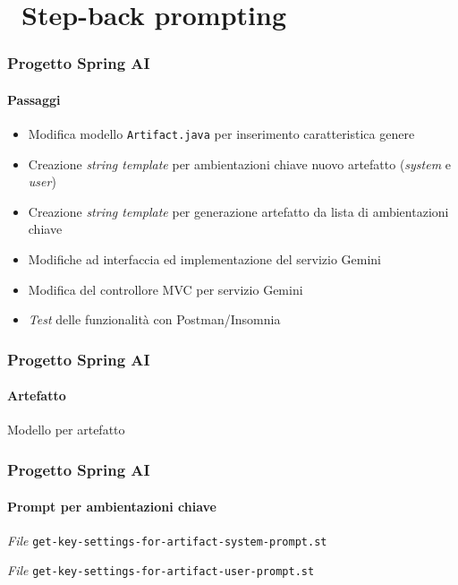 \section{\faWrench\ Step-back prompting} %
\label{sec:spring-ai-gemini-step-back-prompting}
%
\begin{frame}[t,fragile] \frametitle{Progetto Spring AI}
    \framesubtitle{Passaggi}
    {\small
        \begin{itemize}[leftmargin=10pt,align=right]
            \item[\alertedcircled{1}] Modifica modello \texttt{Artifact.java} per inserimento caratteristica genere
            \item[\alertedcircled{2}] Creazione \textit{string template} per ambientazioni chiave nuovo artefatto (\textit{system} e \textit{user})
            \item[\alertedcircled{3}] Creazione \textit{string template} per generazione artefatto da lista di ambientazioni chiave
            \item[\alertedcircled{4}] Modifiche ad interfaccia ed implementazione del servizio Gemini
            \item[\alertedcircled{5}] Modifica del controllore MVC per servizio Gemini
            \item[\alertedcircled{6}] \textit{Test} delle funzionalità con Postman/Insomnia 
        \end{itemize}
    }
\end{frame}
%
\begin{frame}[t,fragile] \frametitle{Progetto Spring AI}
    \framesubtitle{Artefatto}
        \begin{block}{Modello per artefatto}
			{\tiny}
    	\end{block}
\end{frame}
%
\begin{frame}[t,fragile] \frametitle{Progetto Spring AI}
    \framesubtitle{Prompt per ambientazioni chiave}
        \begin{block}{\textit{File} \texttt{get-key-settings-for-artifact-system-prompt.st}}
			{\scriptsize}
    	\end{block}
        \vspace*{.3cm}
        \begin{block}{\textit{File} \texttt{get-key-settings-for-artifact-user-prompt.st}}
			{\scriptsize}
    	\end{block}
\end{frame}
